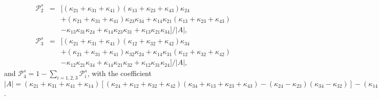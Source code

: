 \documentclass[twocolumn,preprintnumbers,amsmath,amssymb]{revtex4}
\begin{document}
\begin{eqnarray}
\mathcal{P}^s_{2}&=&[(\kappa_{21}+\kappa_{31}+\kappa_{41})(\kappa_{13}+\kappa_{23}+\kappa_{43})\kappa_{24}\\
&&+(\kappa_{21}+\kappa_{31}+\kappa_{41})\kappa_{23}\kappa_{34}+\kappa_{14}\kappa_{21}(\kappa_{13}+\kappa_{23}+\kappa_{43})\nonumber\\
&&-\kappa_{13}\kappa_{31}\kappa_{24}+\kappa_{14}\kappa_{23}\kappa_{31}+\kappa_{13}\kappa_{21}\kappa_{34}]/|A|,\nonumber
\end{eqnarray}
\begin{eqnarray}
\mathcal{P}^s_{3}&=&[(\kappa_{21}+\kappa_{31}+\kappa_{41})(\kappa_{12}+\kappa_{32}+\kappa_{42})\kappa_{34}\\
&&+(\kappa_{21}+\kappa_{31}+\kappa_{41})\kappa_{32}\kappa_{24}+\kappa_{14}\kappa_{31}(\kappa_{12}+\kappa_{32}+\kappa_{42})\nonumber\\
&&-\kappa_{12}\kappa_{21}\kappa_{34}+\kappa_{14}\kappa_{21}\kappa_{32}+\kappa_{12}\kappa_{31}\kappa_{24}]/|A|,\nonumber
\end{eqnarray}
and $\mathcal{P}^s_4=1-\sum_{i=1,2,3}\mathcal{P}^s_i$, with the coefficient
$|A|=(\kappa_{21}+\kappa_{31}+\kappa_{41}+\kappa_{14})[(\kappa_{24}+\kappa_{12}+\kappa_{32}+\kappa_{42})(\kappa_{34}+\kappa_{13}+\kappa_{23}+\kappa_{43})
-(\kappa_{24}-\kappa_{23})(\kappa_{34}-\kappa_{32})]
-(\kappa_{14}-\kappa_{12})[(\kappa_{24}-\kappa_{21})(\kappa_{34}+\kappa_{13}+\kappa_{23}+\kappa_{43})-(\kappa_{24}-\kappa_{23})(\kappa_{34}-\kappa_{31})]
+(\kappa_{14}-\kappa_{13})[(\kappa_{24}-\kappa_{21})(\kappa_{34}-\kappa_{32})-(\kappa_{24}+\kappa_{12}+\kappa_{32}+\kappa_{42})(\kappa_{34}-\kappa_{31})]$.
\end{document}
